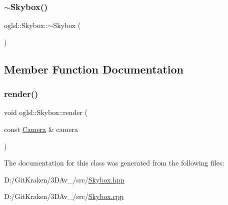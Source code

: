 \mbox{\label{classoglsl_1_1_skybox_ae49b37d4211f0f6f3fb7de0199324a3f}} 
\subsubsection{\texorpdfstring{$\sim$\+Skybox()}{~Skybox()}}
{\footnotesize\ttfamily oglsl\+::\+Skybox\+::$\sim$\+Skybox (\begin{DoxyParamCaption}{ }\end{DoxyParamCaption})}



\subsection{Member Function Documentation}
\mbox{\label{classoglsl_1_1_skybox_a2ee558805867f1acdfab64f689c41f76}} 
\subsubsection{\texorpdfstring{render()}{render()}}
{\footnotesize\ttfamily void oglsl\+::\+Skybox\+::render (\begin{DoxyParamCaption}\item[{const \mbox{\hyperlink{classoglsl_1_1_camera}{Camera}} \&}]{camera }\end{DoxyParamCaption})}



The documentation for this class was generated from the following files\+:\begin{DoxyCompactItemize}
\item 
D\+:/\+Git\+Kraken/3\+D\+Av\+\_/src/\mbox{\hyperlink{_skybox_8hpp}{Skybox.\+hpp}}\item 
D\+:/\+Git\+Kraken/3\+D\+Av\+\_/src/\mbox{\hyperlink{_skybox_8cpp}{Skybox.\+cpp}}\end{DoxyCompactItemize}
